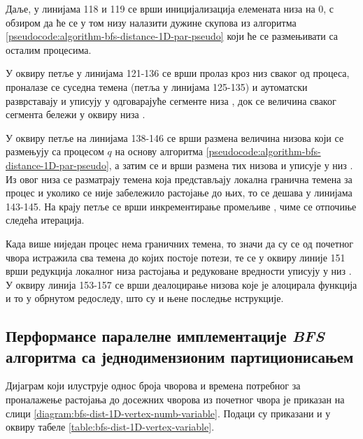 \par
Даље, у линијама 118 и 119 се врши иницијализација елемената низа  на 0, с обзиром да ће се у том низу налазити дужине скупова  из алгоритма \ref{pseudocode:algorithm-bfs-distance-1D-par-pseudo} који ће се размењивати са осталим процесима.

\par
У оквиру петље у линијама 121-136 се врши пролаз кроз низ  сваког од процеса, проналазе се суседна темена (петља у линијама 125-135) и аутоматски разврставају и уписују у одговарајуће сегменте низа , док се величина сваког сегмента бележи у оквиру низа .

\par
У оквиру петље на линијама 138-146 се врши размена величина низова  који се размењују са процесом $q$ на основу алгоритма \ref{pseudocode:algorithm-bfs-distance-1D-par-pseudo}, а затим се и врши размена тих низова и уписује у низ . Из овог низа се разматрају темена која представљају локална гранична темена за процес и уколико се није забележило растојање до њих, то се дешава у линијама 143-145. На крају  петље се врши инкрементирање промељиве , чиме се отпочиње следећа итерација.

\par
Када више ниједан процес нема граничних темена, то значи да су се од почетног чвора истражила сва темена до којих постоје потези, те се у оквиру линије 151 врши редукција локалног низа растојања  и редуковане вредности уписују у низ . У оквиру линија 153-157 се врши деалоцирање низова које је алоцирала функција и то у обрнутом редоследу, што су и њене последње нструкције.

\subsection{Перформансе паралелне имплементације \textit{BFS} алгоритма са једнодимензионим партиционисањем}
Дијаграм који илуструје однос броја чворова и времена потребног за проналажење растојања до досежних чворова из почетног чвора је приказан на слици \ref{diagram:bfs-dist-1D-vertex-numb-variable}. Подаци су приказани и у оквиру табеле \ref{table:bfs-dist-1D-vertex-variable}.

